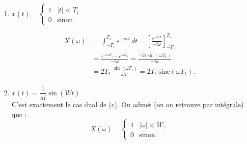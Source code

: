 \begin{solution}
\begin{enumerate}[label=(\alph*)]
        On peut également le calculer comme suit :
        \[
        \begin{aligned}
          X(\omega) 
            &= \int_{-\infty}^{\infty} (\frac{1}{2}e^{-t}e^{i2\pi t}u(t) + \frac{1}{2}e^{-t}e^{-i2\pi t}u(t)) e^{-i\omega t} \,dt \\
            &= \int_{-\infty}^{\infty} \frac{1}{2}e^{-t}e^{i2\pi t}u(t) e^{-i\omega t}  \,dt + \int_{-\infty}^{\infty} \frac{1}{2}e^{-t}e^{-i2\pi t}u(t) e^{-i\omega t} \,dt \\
            &= \int_{-\infty}^{\infty} \frac{1}{2}e^{-t + i2\pi t - i\omega t}u(t)  \,dt + \int_{-\infty}^{\infty} \frac{1}{2}e^{-t -i2\pi t - i\omega t}u(t) \,dt \\
            &= \int_{0}^{\infty} \frac{1}{2}e^{-t + i2\pi t - i\omega t}  \,dt + \int_{0}^{\infty} \frac{1}{2}e^{-t -i2\pi t - i\omega t} \,dt \\
            &= \frac{1}{2} \left[ \frac{e^{-t(1-i2\pi + i \omega)}}{1-i2\pi + i \omega} \right]_{0}^{\infty} + \frac{1}{2} \left[ \frac{e^{-t(1+i2\pi + i \omega)}}{1+i2\pi + i \omega} \right]_{0}^{\infty} \\
            &= \frac{1}{2} \left[ \frac{1}{1 + i(\omega -2\pi)} + \frac{1}{1 + i(\omega + 2\pi)} \right]
        \end{aligned}
        \]

        \item $x(t) = 
          \begin{cases}
            1 & |t|<T_1\\
            0 & \text{sinon}
          \end{cases}$
    
        \[
        \begin{aligned}
          X(\omega) &= \int_{-T_1}^{T_1} e^{-i\omega t}\,dt 
          = \left[ \frac{e^{-i\omega t}}{-i\omega}\right]_{-T_1}^{T_1} \\
          &= \frac{e^{-i\omega T_1} - e^{i\omega T_1}}{-i\omega}
          = \frac{-2i\sin(\omega T_1)}{-i\omega} \\
          &= 2T_1 \,\frac{\sin(\omega T_1)}{\omega T_1}
          = 2T_1\,\mathrm{sinc}(\omega T_1).
        \end{aligned}
        \]

        \item $x(t) = \dfrac{1}{\pi t}\sin(Wt)$ \\

        C’est exactement le cas dual de (c). On admet (ou on retrouve par intégrale) que :
        \[
          X(\omega) =
          \begin{cases}
            1 & |\omega| < W, \\
            0 & \text{sinon}.
          \end{cases}
        \]


\end{enumerate}
\end{solution}
